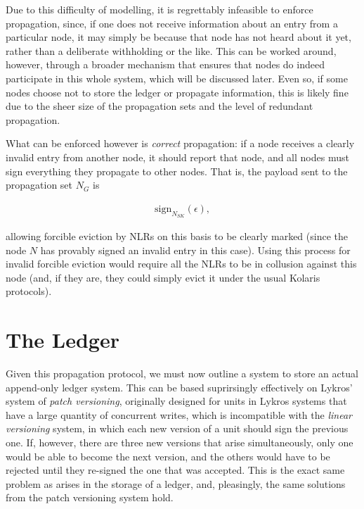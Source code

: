 \documentclass{extreport}
\begin{document}
Due to this difficulty of modelling, it is regrettably infeasible to enforce propagation, since, if one does not receive information about an entry from a particular node, it may simply be because that node has not heard about it yet, rather than a deliberate withholding or the like. This can be worked around, however, through a broader mechanism that ensures that nodes do indeed participate in this whole system, which will be discussed later. Even so, if some nodes choose not to store the ledger or propagate information, this is likely fine due to the sheer size of the propagation sets and the level of redundant propagation.

What can be enforced however is \emph{correct} propagation: if a node receives a clearly invalid entry from another node, it should report that node, and all nodes must sign everything they propagate to other nodes. That is, the payload sent to the propagation set \(N_G\) is

\begin{align*}
\mathrm{sign}_{N_{SK}}(\epsilon), \tag{2.3}
\end{align*}

allowing forcible eviction by NLRs on this basis to be clearly marked (since the node \(N\) has provably signed an invalid entry in this case). Using this process for invalid forcible eviction would require all the NLRs to be in collusion against this node (and, if they are, they could simply evict it under the usual Kolaris protocols).

\chapter{The Ledger}
\label{sec:orge05d024}

Given this propagation protocol, we must now outline a system to store an actual append-only ledger system. This can be based suprirsingly effectively on Lykros' system of \emph{patch versioning}, originally designed for units in Lykros systems that have a large quantity of concurrent writes, which is incompatible with the \emph{linear versioning} system, in which each new version of a unit should sign the previous one. If, however, there are three new versions that arise simultaneously, only one would be able to become the next version, and the others would have to be rejected until they re-signed the one that was accepted. This is the exact same problem as arises in the storage of a ledger, and, pleasingly, the same solutions from the patch versioning system hold.
\end{document}
